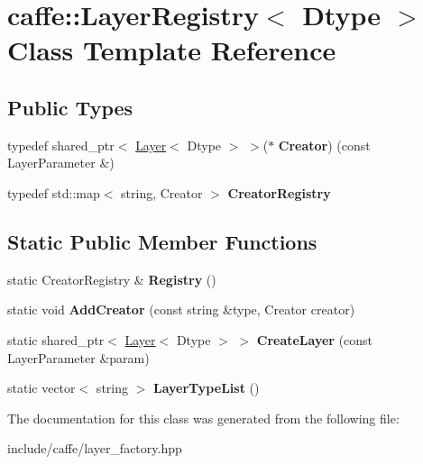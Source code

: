 \hypertarget{classcaffe_1_1LayerRegistry}{}\section{caffe\+:\+:Layer\+Registry$<$ Dtype $>$ Class Template Reference}
\label{classcaffe_1_1LayerRegistry}
\subsection*{Public Types}
\begin{DoxyCompactItemize}
\item 
typedef shared\+\_\+ptr$<$ \hyperlink{classcaffe_1_1Layer}{Layer}$<$ Dtype $>$ $>$($\ast$ {\bfseries Creator}) (const Layer\+Parameter \&)\hypertarget{classcaffe_1_1LayerRegistry_a7b228e5912a515ef6dcf3f90653a62a2}{}\label{classcaffe_1_1LayerRegistry_a7b228e5912a515ef6dcf3f90653a62a2}

\item 
typedef std\+::map$<$ string, Creator $>$ {\bfseries Creator\+Registry}\hypertarget{classcaffe_1_1LayerRegistry_aa3da63563bd0b8c5ed49a5b5bdf8b0ff}{}\label{classcaffe_1_1LayerRegistry_aa3da63563bd0b8c5ed49a5b5bdf8b0ff}

\end{DoxyCompactItemize}
\subsection*{Static Public Member Functions}
\begin{DoxyCompactItemize}
\item 
static Creator\+Registry \& {\bfseries Registry} ()\hypertarget{classcaffe_1_1LayerRegistry_a4b9821dbacaf0d158981fa293d5acf15}{}\label{classcaffe_1_1LayerRegistry_a4b9821dbacaf0d158981fa293d5acf15}

\item 
static void {\bfseries Add\+Creator} (const string \&type, Creator creator)\hypertarget{classcaffe_1_1LayerRegistry_aba9246a3bd332dd9a3c5620b0ddf1e3f}{}\label{classcaffe_1_1LayerRegistry_aba9246a3bd332dd9a3c5620b0ddf1e3f}

\item 
static shared\+\_\+ptr$<$ \hyperlink{classcaffe_1_1Layer}{Layer}$<$ Dtype $>$ $>$ {\bfseries Create\+Layer} (const Layer\+Parameter \&param)\hypertarget{classcaffe_1_1LayerRegistry_a17510acda367b34ddd8a65a1e14e3986}{}\label{classcaffe_1_1LayerRegistry_a17510acda367b34ddd8a65a1e14e3986}

\item 
static vector$<$ string $>$ {\bfseries Layer\+Type\+List} ()\hypertarget{classcaffe_1_1LayerRegistry_a76db56c94b384495ef568a8933c935d9}{}\label{classcaffe_1_1LayerRegistry_a76db56c94b384495ef568a8933c935d9}

\end{DoxyCompactItemize}


The documentation for this class was generated from the following file\+:\begin{DoxyCompactItemize}
\item 
include/caffe/layer\+\_\+factory.\+hpp\end{DoxyCompactItemize}

